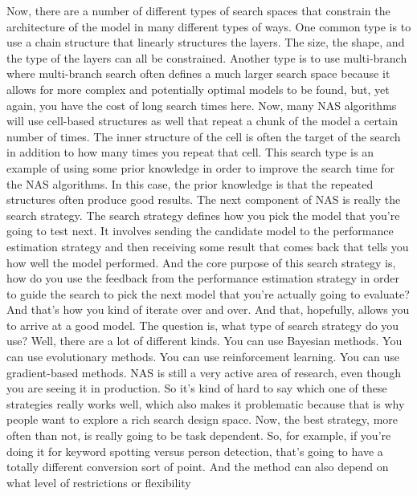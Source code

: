 {{{{    Now, there are a number of different types of search spaces
    that constrain the architecture of the model in many different types of ways.
    One common type is to use a chain structure
    that linearly structures the layers.
    The size, the shape, and the type of the layers can all be constrained.
    Another type is to use multi-branch where multi-branch search often
    defines a much larger search space because it allows
    for more complex and potentially optimal models to be found,
    but, yet again, you have the cost of long search times here.
    Now, many NAS algorithms will use cell-based structures
    as well that repeat a chunk of the model a certain number of times.
    The inner structure of the cell is often the target of the search in addition
    to how many times you repeat that cell.
    This search type is an example of using some prior knowledge in order
    to improve the search time for the NAS algorithms.
    In this case, the prior knowledge is that the repeated structures often
    produce good results.
    The next component of NAS is really the search strategy.
    The search strategy defines how you pick the model
    that you're going to test next.
    It involves sending the candidate model to the performance estimation strategy
    and then receiving some result that comes back that tells you
    how well the model performed.
    And the core purpose of this search strategy
    is, how do you use the feedback from the performance estimation strategy
    in order to guide the search to pick the next model that you're actually
    going to evaluate?
    And that's how you kind of iterate over and over.
    And that, hopefully, allows you to arrive at a good model.
    The question is, what type of search strategy do you use?
    Well, there are a lot of different kinds.
    You can use Bayesian methods.
    You can use evolutionary methods.
    You can use reinforcement learning.
    You can use gradient-based methods.
    NAS is still a very active area of research,
    even though you are seeing it in production.
    So it's kind of hard to say which one of these strategies
    really works well, which also makes it problematic because that
    is why people want to explore a rich search design space.
    Now, the best strategy, more often than not,
    is really going to be task dependent.
    So, for example, if you're doing it for keyword spotting versus person
    detection, that's going to have a totally different conversion
    sort of point.
    And the method can also depend on what level of restrictions or flexibility
}}}}
